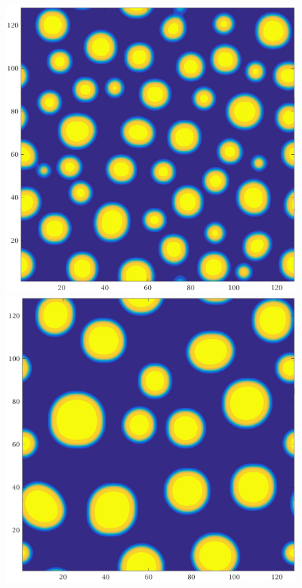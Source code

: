 \documentclass[a4paper,6pt]{article}
\begin{document}
\begin{figure}[H]
        \begin{minipage}[b]{.32\linewidth}        
                \centering
                \includegraphics[width=1\textwidth]{pics/C1_t4.jpg}
        \end{minipage}
        \begin{minipage}[b]{.32\linewidth}
                \centering
                \includegraphics[width=1\textwidth]{pics/C1_t5.jpg}

\end{minipage}
\end{figure}
\end{document}
